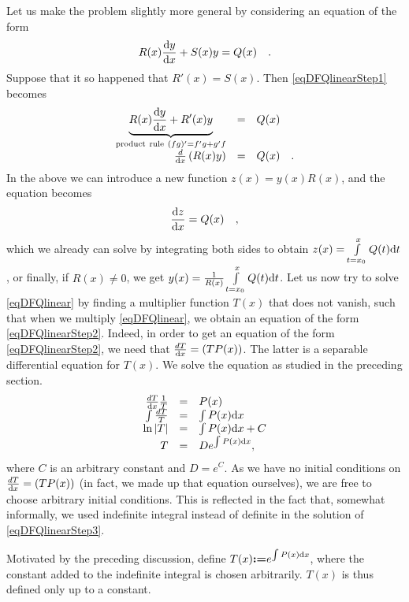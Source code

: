 \documentclass[12pt]{book}
\newcommand{\eqdef}{\textbf{:=}}
\begin{document}
Let us make the problem slightly more general by considering an equation of the form
\begin{equation}\label{eqDFQlinearStep1}
R(x)\frac{{\normalfont \text{d}} y}{{\normalfont \text{d}} x} + S(x)y=Q(x)\quad .
\end{equation}
Suppose that it so happened that $R'(x)=S(x)$. Then \eqref{eqDFQlinearStep1} becomes
\begin{equation}\label{eqDFQlinearStep2}
\begin{array}{rcl}
\underbrace{R(x)\frac{{\normalfont \text{d}} y}{{\normalfont \text{d}} x} + R'(x)y}_{\mathrm{product~rule~}(fg)'=f'g+g'f}&=&Q(x)\\
\frac{d}{{\normalfont \text{d}} x} \left(R(x)y \right)&=& Q(x)\quad .
\end{array}
\end{equation}
In the above we can introduce a new function $z(x)= y(x)R(x)$, and the equation becomes
\[
\frac{{\normalfont \text{d}} z}{{\normalfont \text{d}} x}= Q(x)\quad ,
\]
which we already can solve by integrating both sides to obtain $z(x)= \int\limits_{t=x_0}^x Q(t){\normalfont \text{d}} t $, or finally, if $R(x)\neq 0$, we get $y(x)= \frac{1}{R(x)}\int\limits_{t=x_0}^x Q(t){\normalfont \text{d}} t $.
Let us now try to solve \eqref{eqDFQlinear} by finding a multiplier function $T(x)$ that does not vanish, such that when we multiply \eqref{eqDFQlinear}, we obtain an equation of the form \eqref{eqDFQlinearStep2}. Indeed, in order to get an equation of the form \eqref{eqDFQlinearStep2}, we need that $\frac{dT}{{\normalfont \text{d}} x}= (TP(x))$. The latter is a separable differential equation for $T(x)$.  We solve the equation as studied in the preceding section.
\begin{equation}\label{eqDFQlinearStep3}
\begin{array}{rcl}
\frac{dT}{{\normalfont \text{d}} x}\frac{1}{T}&=&P(x)\\
\int\frac{dT}{T}&=&\int P(x){\normalfont \text{d}} x\\
\ln |T|&=&  \int P(x){\normalfont \text{d}} x+C\\
T&=&De^{\int P(x){\normalfont \text{d}} x},
\end{array}
\end{equation}
where $C$ is an arbitrary constant and $D=e^C$. As we have no initial conditions on $\frac{dT}{{\normalfont \text{d}} x}= (TP(x))$ (in fact, we made up that equation ourselves), we are free to choose arbitrary initial conditions. This is reflected in the fact that, somewhat informally, we used indefinite integral instead of definite in the solution of \eqref{eqDFQlinearStep3}.

Motivated by the preceding discussion, define $T(x)\eqdef e^{\int P(x)\diff x}$, where the constant added to the indefinite integral is chosen arbitrarily. $T(x)$ is thus defined only up to a constant.
\end{document}

